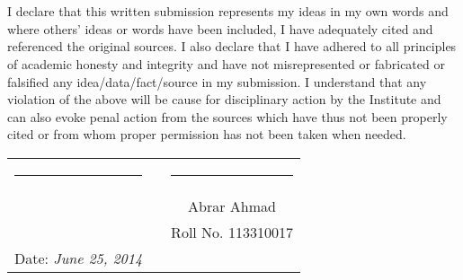 \chapter*{}
\thispagestyle{empty}

I declare that this written submission represents my ideas in my own words
and where others' ideas or words have been included, I have adequately cited
and referenced the original sources. I also declare that I have adhered to all
principles of academic honesty and integrity and have not misrepresented or
fabricated or falsified any idea/data/fact/source in my submission. I
understand that any violation of the above will be cause for disciplinary
action by the Institute and can also evoke penal action from the sources which
have thus not been properly cited or from whom proper permission has not been
taken when needed.

\vspace{1.5cm}

\begin{tabular}{llc}
\rule{40mm}{0pt}        & \rule{50mm}{0pt}       & \rule{55mm}{0pt} \\
                        &                        & \large{Abrar Ahmad} \\
                        &                        & Roll No. 113310017 \\
Date: \emph{June 25, 2014}  &                        & \\
\end{tabular}